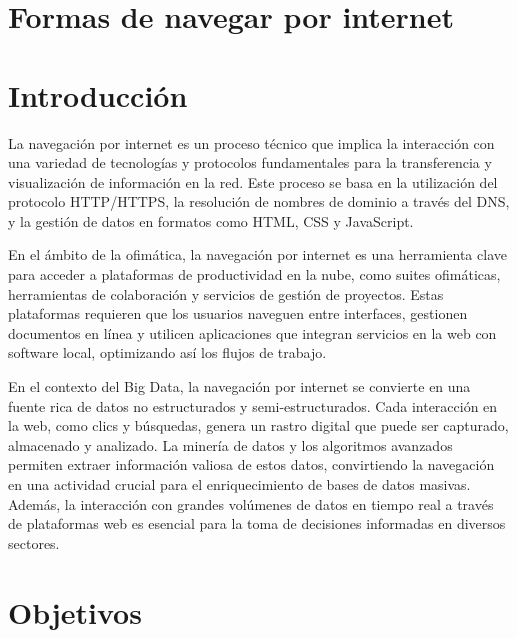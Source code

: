\documentclass[12pt]{article}
\begin{document}
        

        \tableofcontents
        \newpage

        \section*{\centering Formas de navegar por internet} \vspace{.5cm}

        \section{Introducción}
                La navegación por internet es un proceso técnico que implica la interacción con una variedad de tecnologías y protocolos fundamentales para la transferencia y visualización de información en la red. Este proceso se basa en la utilización del protocolo HTTP/HTTPS, la resolución de nombres de dominio a través del DNS, y la gestión de datos en formatos como HTML, CSS y JavaScript.

                En el ámbito de la ofimática, la navegación por internet es una herramienta clave para acceder a plataformas de productividad en la nube, como suites ofimáticas, herramientas de colaboración y servicios de gestión de proyectos. Estas plataformas requieren que los usuarios naveguen entre interfaces, gestionen documentos en línea y utilicen aplicaciones que integran servicios en la web con software local, optimizando así los flujos de trabajo.
                
                En el contexto del Big Data, la navegación por internet se convierte en una fuente rica de datos no estructurados y semi-estructurados. Cada interacción en la web, como clics y búsquedas, genera un rastro digital que puede ser capturado, almacenado y analizado. La minería de datos y los algoritmos avanzados permiten extraer información valiosa de estos datos, convirtiendo la navegación en una actividad crucial para el enriquecimiento de bases de datos masivas. Además, la interacción con grandes volúmenes de datos en tiempo real a través de plataformas web es esencial para la toma de decisiones informadas en diversos sectores.


        \section{Objetivos}
\end{document}
